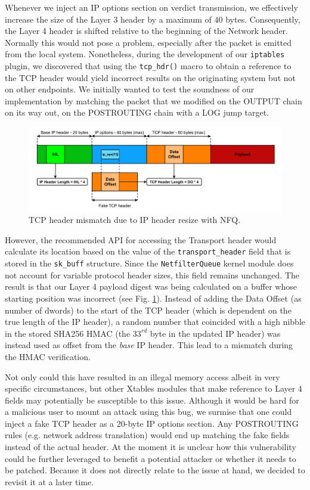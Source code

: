 Whenever we inject an IP options section on verdict transmission, we effectively increase the size of the Layer 3 header by a maximum of 40 bytes. Consequently, the Layer 4 header is shifted relative to the beginning of the Network header. Normally this would not pose a problem, especially after the packet is emitted from the local system. Nonetheless, during the development of our \texttt{iptables} plugin, we discovered that using the \texttt{tcp\_hdr()} macro to obtain a reference to the TCP header would yield incorrect results on the originating system but not on other endpoints. We initially wanted to test the soundness of our implementation by matching the packet that we modified on the OUTPUT chain on its way out, on the POSTROUTING chain with a LOG jump target.

\begin{figure}
    \centering
    \includegraphics[width=\textwidth,keepaspectratio]{figures/daf-nfq-bug.pdf}
    \caption{TCP header mismatch due to IP header resize with NFQ.}
    \label{appfw:daf:fig:nfq-bug}
\end{figure}

However, the recommended API for accessing the Transport header would calculate its location based on the value of the \texttt{transport\_header} field that is stored in the \texttt{sk\_buff} structure. Since the \texttt{NetfilterQueue} kernel module does not account for variable protocol header sizes, this field remains unchanged. The result is that our Layer 4 payload digest was being calculated on a buffer whose starting position was incorrect (see Fig. \ref{appfw:daf:fig:nfq-bug}). Instead of adding the Data Offset (as number of dwords) to the start of the TCP header (which is dependent on the true length of the IP header), a random number that coincided with a high nibble in the stored SHA256 HMAC (the $33^{rd}$ byte in the updated IP header) was instead used as offset from the \textit{base} IP header. This lead to a mismatch during the HMAC verification.

Not only could this have resulted in an illegal memory access albeit in very specific circumstances, but other Xtables modules that make reference to Layer 4 fields may potentially be susceptible to this issue. Although it would be hard for a malicious user to mount an attack using this bug, we surmise that one could inject a fake TCP header as a 20-byte IP options section. Any POSTROUTING rules (e.g. network address translation) would end up matching the fake fields instead of the actual header. At the moment it is unclear how this vulnerability could be further leveraged to benefit a potential attacker or whether it needs to be patched. Because it does not directly relate to the issue at hand, we decided to revisit it at a later time.

